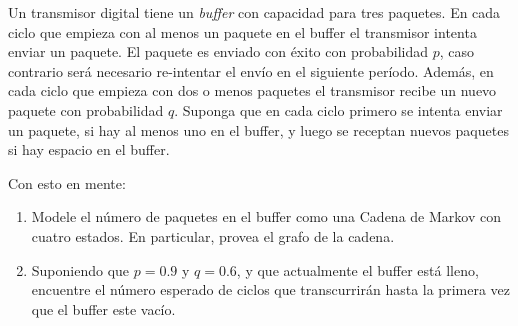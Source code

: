 \documentclass[ a4paper, twoside, 11pt]{article}
\begin{document}
\begin{problem}
Un transmisor digital tiene un \emph{buffer} con capacidad para tres paquetes. \linebreak En cada ciclo que empieza con al menos un paquete en el buffer el transmisor intenta enviar un paquete. El paquete es enviado con \'exito con probabilidad $p$, caso contrario ser\'a necesario re-intentar el env\'io en el siguiente per\'iodo. Adem\'as, en cada ciclo que empieza con dos o menos paquetes el transmisor recibe un nuevo paquete con probabilidad $q$. Suponga que en cada ciclo primero se intenta enviar un paquete, si hay al menos uno en el buffer, y luego se receptan nuevos paquetes si hay espacio en el buffer. 

Con esto en mente: 
\begin{enumerate}[label=\textbf{\alph*)}]
\item Modele el n\'umero de paquetes en el buffer como una Cadena de Markov con cuatro estados. En particular, provea el grafo de la cadena. 

%
%

\item Suponiendo que $p = 0.9$ y $q = 0.6$, y que actualmente el buffer est\'a lleno, encuentre el n\'umero esperado de ciclos que transcurrir\'an hasta la primera vez que el buffer este vac\'io. 

%
%
%


\end{enumerate}
\end{problem}
\end{document}
